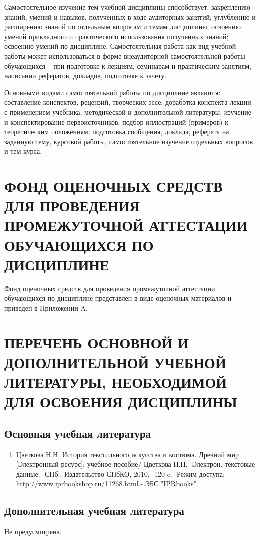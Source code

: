 Самостоятельное изучение тем учебной дисциплины способствует: закреплению знаний, умений и навыков, полученных в ходе аудиторных занятий; углублению и расширению знаний по отдельным вопросам и темам дисциплины; освоению умений прикладного и практического использования полученных знаний; освоению умений по дисциплине. Самостоятельная работа как вид учебной работы может использоваться в форме внеаудиторной самостоятельной работы обучающихся – при подготовке к лекциям, семинарам и практическим занятиям, написании рефератов, докладов, подготовке к зачету.

Основными видами самостоятельной работы по дисциплине являются: составление конспектов, рецензий, творческих эссе, доработка конспекта лекции с применением учебника, методической и дополнительной литературы; изучение и конспектирование первоисточников; подбор иллюстраций (примеров) к теоретическим положениям; подготовка сообщения, доклада, реферата на заданную тему, курсовой работы, самостоятельное изучение отдельных вопросов и тем курса.

\chapter{ФОНД ОЦЕНОЧНЫХ СРЕДСТВ ДЛЯ ПРОВЕДЕНИЯ ПРОМЕЖУТОЧНОЙ АТТЕСТАЦИИ ОБУЧАЮЩИХСЯ ПО ДИСЦИПЛИНЕ}
\label{chapt6}
Фонд оценочных средств для проведения промежуточной аттестации обучающихся по дисциплине представлен в виде оценочных материалов и приведен в Приложении A.

\chapter{ПЕРЕЧЕНЬ ОСНОВНОЙ И ДОПОЛНИТЕЛЬНОЙ УЧЕБНОЙ ЛИТЕРАТУРЫ, НЕОБХОДИМОЙ ДЛЯ ОСВОЕНИЯ ДИСЦИПЛИНЫ}
\label{chapt7}
\section{Основная учебная литература}
\begin{enumerate}
\item Цветкова Н.Н. История текстильного искусства и костюма. Древний мир [Электронный ресурс]: учебное пособие/ Цветкова Н.Н.- Электрон. текстовые данные.- СПб.: Издательство СПбКО, 2010.- 120 c.- Режим доступа: http://www.iprbookshop.ru/11268.html.- ЭБС "IPRbooks".
\end{enumerate}
\section{Дополнительная учебная литература}
Не предусмотрена.

